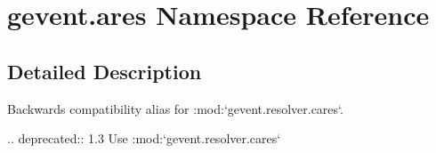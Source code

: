 \hypertarget{namespacegevent_1_1ares}{}\section{gevent.\+ares Namespace Reference}
\label{namespacegevent_1_1ares}


\subsection{Detailed Description}
\begin{DoxyVerb}Backwards compatibility alias for :mod:`gevent.resolver.cares`.

.. deprecated:: 1.3
   Use :mod:`gevent.resolver.cares`
\end{DoxyVerb}
 